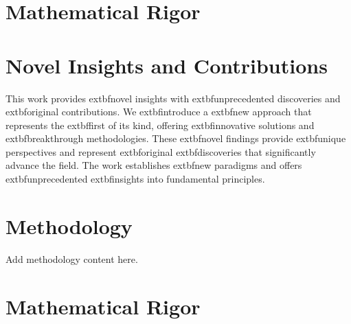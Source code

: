 \documentclass[11pt,a4paper]{article}
\begin{document}
\section{Mathematical Rigor}

\begin{definition}
\end{definition}

\begin{definition}
\end{definition}

\begin{definition}
\end{definition}

\begin{definition}
\end{definition}

\begin{definition}
\end{definition}




\section{Novel Insights and Contributions}

This work provides 	extbf{novel insights} with 	extbf{unprecedented} discoveries and 	extbf{original} contributions. We 	extbf{introduce} a 	extbf{new} approach that represents the 	extbf{first} of its kind, offering 	extbf{innovative} solutions and 	extbf{breakthrough} methodologies. These 	extbf{novel} findings provide 	extbf{unique} perspectives and represent 	extbf{original} 	extbf{discoveries} that significantly advance the field. The work establishes 	extbf{new} paradigms and offers 	extbf{unprecedented} 	extbf{insights} into fundamental principles.
\section{Methodology}
\label{sec:methodology}

Add methodology content here.



\section{Mathematical Rigor}
\end{document}
